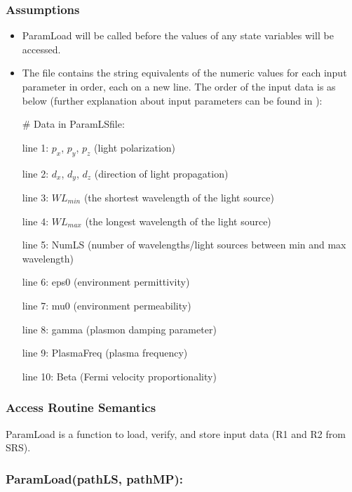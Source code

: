 \documentclass[12pt, titlepage]{article}
\begin{document}
	\subsubsection{Assumptions} \begin{itemize}
		
		\item ParamLoad will be called before the values of any state variables will be
		accessed.
		
		\item The file contains the string equivalents of the numeric values for each
		input parameter in order, each on a new line. The order of the input data is as
		below (further explanation about input parameters can be found in ):
		
		\# Data in ParamLSfile:
		
		line 1: $p_x$, $p_y$, $p_z$ (light polarization)
		
		line 2: $d_x$, $d_y$, $d_z$ (direction of light propagation)
		
		line 3: $WL_{min}$ (the shortest wavelength of the light source)
		
		line 4: $WL_{max}$ (the longest wavelength of the light source)
		 
		line 5: NumLS (number of wavelengths/light sources between min and max wavelength)
		
		line 6: eps0 (environment permittivity)
		
		line 7: mu0 (environment permeability)
		
		line 8: gamma (plasmon damping parameter)
		
		line 9: PlasmaFreq (plasma frequency)
		
		line 10: Beta (Fermi velocity proportionality)
		
		
	\end{itemize}
	
	\subsubsection{Access Routine Semantics}
	
	ParamLoad is a function to load, verify, and store input data (R1 and R2 from SRS).
	
	\subsubsection*{ParamLoad(pathLS, pathMP):}
	
\end{document}
